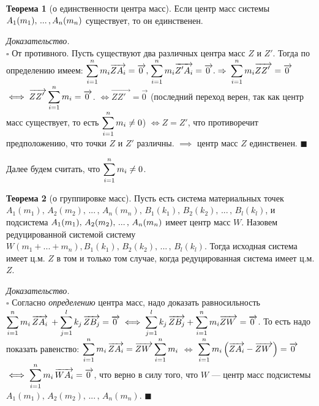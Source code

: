 \documentclass[14pt]{extarticle}
\let\Overrightarrow\overrightarrow
\let\vecarrow\overrightarrow
\theoremstyle{definition}
\theoremstyle{theorem}
\newtheorem*{theorem}{Теорема}
\renewenvironment{proof}
    {\noindent \textit{Доказательство.}\\
	\indent $\square$}
	{ $\blacksquare$\\ }
\begin{document}
\begin{theorem}[о единственности центра масс]
    Если центр масс системы $A_1(m_1), \\  \, ... \, ,A_n(m_n)$
	существует, то он единственен.
\end{theorem}

\begin{proof}
От противного. Пусть существуют два различных центра масс $Z$ и $Z'$.
Тогда по определению имеем: $\mathlarger{\sum_{i=1}^{n} m_i  \vecarrow{ZA_i}
= \vecarrow{0_{\,}},} \;  \mathlarger{\sum_{i=1}^{n} m_i  \vecarrow{Z'A_i}} = \vecarrow{0_{\,}}. 
\Rightarrow$ $\mathlarger{\sum_{i=1}^{n} m_i  \vecarrow{ZZ'_{\;\:\,}}} = \vecarrow{0_{\,}}$
$\iff \mathlarger{\vecarrow{ZZ'_{\;\:\,}} \sum_{i=1}^{n} m_i} = \vecarrow{0_{\,}}$. 
$\iff \vecarrow{ZZ'_{\;\:\,}} = \vecarrow{0_{\,}}$ (последний переход верен, 
так как центр масс существует, то есть
$\mathlarger{\sum_{i=1}^{n} m_i \ne 0}$) $\iff Z = Z'$, что противоречит
предположению, что точки $Z$ и $Z'$ различны. $\implies$ центр масс $Z$
единственен.
\end{proof}

\noindent Далее будем считать, что $\mathlarger{\sum_{i=1}^{n} m_i \ne 0}$.

\begin{theorem}[о группировке масс]
Пусть есть система материальных точек $A_1(m_1),  \, A_2(m_2), \, ... \, ,
\, A_n(m_n), \, B_1(k_1), \, B_2(k_2), \, ... \, , \, B_l(k_l)$, 
	и подсистема $A_1(m_1), \\ \, A_2(m_2), \, ... \, , 
	\, A_n(m_n)$ имеет центр масс $W$.
Назовем редуцированной системой систему $W(m_1 + ... + m_n), B_1(k_1),
\, B_2(k_2), \, ... \, , \, B_l(k_l)$. Тогда исходная система имеет ц.м. $Z$
в том и только том случае, когда редуцированная система имеет ц.м. $Z$.
\end{theorem}



\begin{proof}
Согласно \textit{определению} центра масс, надо доказать равносильность\\
$\mathlarger{\sum_{i=1}^{n} m_i \, \Overrightarrow{ZA_i} \: + 
\sum_{j=1}^{l} k_j \, \Overrightarrow{ZB_j}} = \vecarrow{0_{\,}} \iff 
\mathlarger{\sum_{j=1}^{l} k_j \, \Overrightarrow{ZB_j} + 
	 \sum_{i=1}^{n} m_i  \Overrightarrow{ZW_{\: \,}}} = \vecarrow{0_{\,}}$.
То есть надо показать равенство:
$\mathlarger{\sum_{i=1}^{n} m_i \, \Overrightarrow{ZA_i} = 
\Overrightarrow{ZW_{\: \,}} \sum_{i=1}^{n} m_i}$ $\iff$   
$\mathlarger{\sum_{i=1}^{n}
m_i \, \Big(\Overrightarrow{ZA_i} - \Overrightarrow{ZW_{\: \,}}\Big)} = \vecarrow{0_{\,}}$ 
$\iff \mathlarger{\sum_{i=1}^{n}
m_i \, \Overrightarrow{WA_i}} = \vecarrow{0_{\,}}$, что верно в силу того, что $W$ ---
центр масс подсистемы $A_1(m_1), \, A_2(m_2), \, ... \, , \, A_n(m_n)$.
\end{proof}
\end{document}

